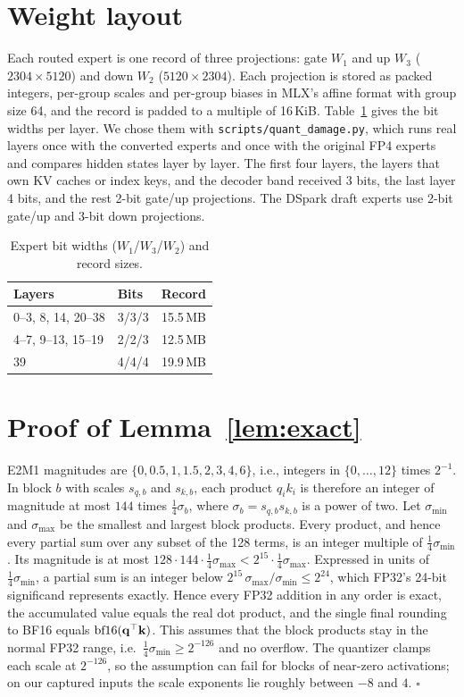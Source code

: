 \section{Weight layout}
\label{app:format}
Each routed expert is one record of three projections: gate $W_1$ and up $W_3$ ($2304\times5120$) and down $W_2$ ($5120\times2304$). Each projection is stored as packed integers, per-group scales and per-group biases in MLX's affine format with group size 64, and the record is padded to a multiple of 16\,KiB. Table~\ref{tab:layers} gives the bit widths per layer. We chose them with \texttt{scripts/quant\_damage.py}, which runs real layers once with the converted experts and once with the original FP4 experts and compares hidden states layer by layer. The first four layers, the layers that own KV caches or index keys, and the decoder band received 3 bits, the last layer 4 bits, and the rest 2-bit gate/up projections. The DSpark draft experts use 2-bit gate/up and 3-bit down projections.

\begin{table}[h]
\centering
\small
\caption{Expert bit widths ($W_1$/$W_3$/$W_2$) and record sizes.}
\label{tab:layers}
\begin{tabular}{@{}llr@{}}
\toprule
Layers & Bits & Record \\
\midrule
0--3, 8, 14, 20--38 & 3/3/3 & 15.5\,MB \\
4--7, 9--13, 15--19 & 2/2/3 & 12.5\,MB \\
39 & 4/4/4 & 19.9\,MB \\
\bottomrule
\end{tabular}
\end{table}

\section{Proof of Lemma~\ref{lem:exact}}
\label{app:exact}
E2M1 magnitudes are $\{0, 0.5, 1, 1.5, 2, 3, 4, 6\}$, i.e., integers in $\{0,\dots,12\}$ times $2^{-1}$. In block $b$ with scales $s_{q,b}$ and $s_{k,b}$, each product $q_ik_i$ is therefore an integer of magnitude at most $144$ times $\tfrac14\sigma_b$, where $\sigma_b=s_{q,b}s_{k,b}$ is a power of two. Let $\sigma_{\min}$ and $\sigma_{\max}$ be the smallest and largest block products. Every product, and hence every partial sum over any subset of the 128 terms, is an integer multiple of $\tfrac14\sigma_{\min}$. Its magnitude is at most $128\cdot144\cdot\tfrac14\sigma_{\max}<2^{15}\cdot\tfrac14\sigma_{\max}$. Expressed in units of $\tfrac14\sigma_{\min}$, a partial sum is an integer below $2^{15}\,\sigma_{\max}/\sigma_{\min}\le2^{24}$, which FP32's 24-bit significand represents exactly. Hence every FP32 addition in any order is exact, the accumulated value equals the real dot product, and the single final rounding to BF16 equals $\operatorname{bf16}(\mathbf q^\top\mathbf k)$. This assumes that the block products stay in the normal FP32 range, i.e.\ $\tfrac14\sigma_{\min}\ge2^{-126}$ and no overflow. The quantizer clamps each scale at $2^{-126}$, so the assumption can fail for blocks of near-zero activations; on our captured inputs the scale exponents lie roughly between $-8$ and $4$. \hfill$\square$

